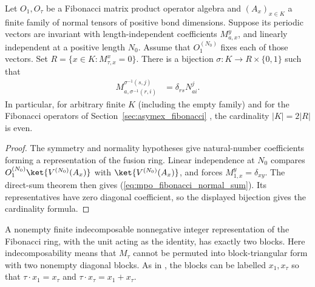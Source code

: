 \begin{lemma}%
    \label{thm:mpo_symmetry_fibonacci_normal_decomposition}
    \leanok
    Let $O_1,O_\tau$ be a Fibonacci matrix product operator algebra and
    $(A_x)_{x\in K}$ a finite family of normal tensors of positive bond
    dimensions. Suppose its periodic vectors are invariant with
    length-independent coefficients $M_{a,x}^y$, and linearly independent
    at a positive length $N_0$. Assume that $O_1^{(N_0)}$ fixes each of
    those vectors. Set $R=\{x\in K:M_{\tau,x}^x=0\}$.
    There is a bijection $\sigma:K\longrightarrow R\times\{0,1\}$ such that
    \begin{align}
        M_{a,\sigma^{-1}(r,i)}^{\sigma^{-1}(s,j)}
         & =\delta_{rs}N_{ai}^j.
        \label{eq:mpo_fibonacci_normal_sum}
    \end{align}
    In particular, for arbitrary finite $K$ (including the empty family)
    and for the Fibonacci operators of Section~\ref{sec:asymex_fibonacci}
    \cite[Sections~3 and~6]{GarreRubio2023MPOSym}, the cardinality
    $|K|=2|R|$ is even.
\end{lemma}

\begin{proof}
    \leanok
    The symmetry and normality hypotheses give natural-number coefficients
    forming a representation of the fusion ring. Linear independence at
    $N_0$ compares $O_1^{(N_0)}\ket{V^{(N_0)}(A_x)}$ with
    $\ket{V^{(N_0)}(A_x)}$, and forces $M_{1,x}^y=\delta_{xy}$.
    The direct-sum theorem then gives (\ref{eq:mpo_fibonacci_normal_sum}).
    Its representatives have zero diagonal coefficient, so the displayed
    bijection gives the cardinality formula.
\end{proof}

\begin{lemma}%
    \label{thm:mpo_symmetry_fibonacci_indecomposable}
    \leanok
    A nonempty finite indecomposable nonnegative integer representation
    of the Fibonacci ring, with the unit acting as the identity, has
    exactly two blocks. Here indecomposability means that $M_\tau$ cannot
    be permuted into block-triangular form with two nonempty diagonal blocks.
    As in \cite[Section~6]{GarreRubio2023MPOSym}, the blocks can be
    labelled $x_1,x_\tau$ so that $\tau\cdot x_1=x_\tau$ and
    $\tau\cdot x_\tau=x_1+x_\tau$.
\end{lemma}

